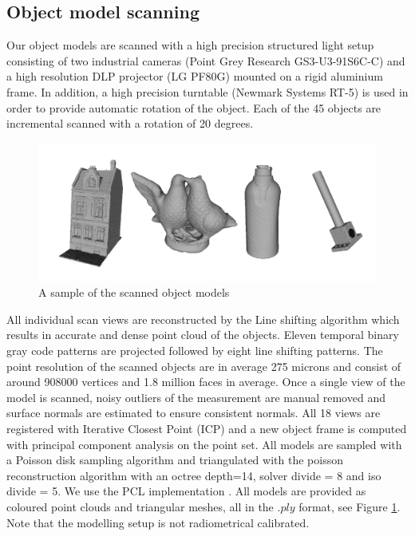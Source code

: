 \documentclass[10pt,twocolumn,letterpaper]{article}
\begin{document}
\subsection{Object model scanning}\label{sec:object_scanning}
Our object models are scanned with a high precision structured light setup consisting of two industrial cameras (Point Grey Research GS3-U3-91S6C-C) and
a high resolution DLP projector (LG PF80G) mounted on a rigid aluminium frame. In addition, a high precision turntable (Newmark Systems RT-5) is used in order to provide automatic rotation of the object. Each of the 45 objects are incremental scanned with a rotation of 20 degrees. 
\begin{figure}[htp]
\centering
\includegraphics[clip, trim=1cm 1cm 1cm 1.3cm,width=0.9\linewidth, height= 0.4\linewidth, keepaspectratio]{img/objects/objects.pdf}
\caption{A sample of the scanned object models}
\label{fig:objects}
\end{figure}
All individual scan views are reconstructed by the Line shifting algorithm \cite{Guehring2000} which results in accurate and dense point cloud of the objects. Eleven temporal binary gray code patterns are projected followed by eight line shifting patterns. The point resolution of the scanned objects are in average 275 microns and consist of around 908000 vertices and 1.8 million faces in average. Once a single view of the model is scanned, noisy outliers of the measurement are manual removed and surface normals are estimated to ensure consistent normals. All 18 views are registered with Iterative Closest Point (ICP) and a new object frame is computed with principal component analysis on the point set. All models are sampled with a Poisson disk sampling algorithm \cite{Corsini2012} and triangulated with the poisson reconstruction algorithm \cite{Kazhdan2006} with an octree depth=14, solver divide = 8 and iso divide = 5. We use the PCL implementation \cite{RusuCousins2011}. All models are provided as coloured point clouds and triangular meshes, all in the $.ply$ format, see Figure \ref{fig:objects}. Note that the modelling setup is not radiometrical calibrated.
\end{document}
